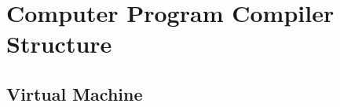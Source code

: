 \documentclass[thesis=M,english]{FITthesis}[2018/10/20]
\begin{document}
\section{Computer Program Compiler Structure}







\subsection{Virtual Machine}\label{VM}
\end{document}
